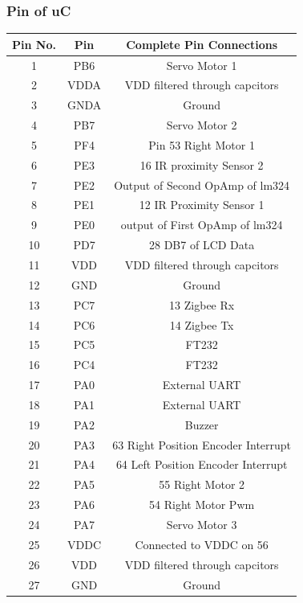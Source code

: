 \documentclass[a4paper,12pt,oneside]{article}
\begin{document}
{		\subsubsection{\Large\textbf{Pin of uC}}
			\begin{longtable}{|c|c|c|}\hline
				Pin No.&Pin & 	Complete Pin Connections\\ \hline
				1 &		PB6	&	Servo Motor 1\\ \hline
				2 &		VDDA&	VDD filtered through capcitors\\ \hline
				3 &		GNDA&	Ground\\ \hline
				4 &		PB7 &	Servo Motor 2\\ \hline
				5 & 	PF4 &	Pin 53 Right Motor 1\\ \hline
				6 &		PE3	&	16 IR proximity Sensor 2\\ \hline
				7 &		PE2 &	Output of Second OpAmp of lm324\\ \hline
				8 &		PE1 &	12 IR Proximity Sensor 1 \\ \hline
				9 &		PE0 &	output of First OpAmp of lm324\\ \hline
				10 &	PD7 &	28 DB7 of LCD Data\\ \hline
				11 &	VDD &	VDD filtered through capcitors\\ \hline
				12 &	GND	 &	Ground\\ \hline
				13 &	PC7	 &	13 Zigbee Rx\\ \hline
				14 &	PC6	 &	14 Zigbee Tx\\ \hline
				15 & 	PC5	 &	FT232\\ \hline
				16 & 	PC4 &	FT232\\ \hline 
				17 &	PA0 &	External UART\\ \hline
				18 &	PA1 &	External UART\\ \hline
				19 &	PA2 &	Buzzer\\ \hline
				20 &	PA3 &	63 Right Position Encoder Interrupt\\ \hline
				21 &	PA4	 &	64 Left Position Encoder Interrupt\\ \hline
				22 &	PA5 &	55 Right Motor 2\\ \hline
				23 &	PA6 &	54 Right Motor Pwm\\ \hline
				24 &	PA7 &	Servo Motor 3\\ \hline
				25 &	VDDC &	Connected to VDDC on 56\\ \hline
				26 &	VDD	 &	VDD filtered through capcitors\\ \hline
				27 &	GND	 &	Ground\\ \hline

\end{longtable}}
\end{document}
